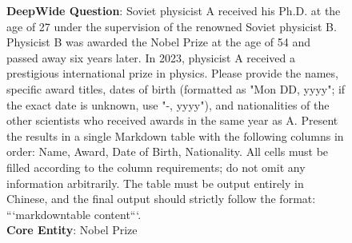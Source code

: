 \documentclass[11pt, letterpaper, logo, onecolumn, copyright, numbering]{paper_improved}
\begin{document}
\begin{figure}[htbp]
\begin{center}\end{center}\vspace{2mm}
    \begin{tcolorbox}[
        title=Input of Deep2Wide\_62 Instance,
        colback=yellow!10,
        colbacktitle=black!80,
        coltitle=white,
        arc=1mm,
        boxrule=0pt,
        breakable]
        \textbf{DeepWide Question}: Soviet physicist A received his Ph.D. at the age of 27 under the supervision of the renowned Soviet physicist B. Physicist B was awarded the Nobel Prize at the age of 54 and passed away six years later. In 2023, physicist A received a prestigious international prize in physics. Please provide the names, specific award titles, dates of birth (formatted as "Mon DD, yyyy"; if the exact date is unknown, use "-, yyyy"), and nationalities of the other scientists who received awards in the same year as A. Present the results in a single Markdown table with the following columns in order: Name, Award, Date of Birth, Nationality. All cells must be filled according to the column requirements; do not omit any information arbitrarily. The table must be output entirely in Chinese, and the final output should strictly follow the format: ```markdown{table content}```.\\
        \medskip
        \textbf{Core Entity}: Nobel Prize
    \end{tcolorbox}
    

\end{figure}
\end{document}
